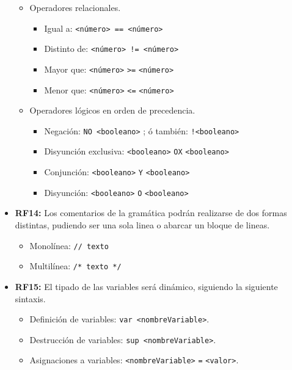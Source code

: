 \begin{itemize}
\begin{itemize}
        \item Operadores relacionales.
          
          \begin{itemize}
          \item Igual a:  \texttt{<número> == <número>}
          \item Distinto de: \texttt{<número> != <número>}
          \item Mayor que: \texttt{<número>} \texttt{>=} \texttt{<número>}
          \item Menor que: \texttt{<número>} \texttt{<=} \texttt{<número>}
          \end{itemize}
          
        \item Operadores lógicos en orden de precedencia.
          
          \begin{itemize}
          \item Negación: \texttt{NO <booleano>} ; ó también:  \texttt{!<booleano>}
          \item Disyunción exclusiva: \texttt{<booleano>} \texttt{OX} \texttt{<booleano>}
          \item Conjunción: \texttt{<booleano>} \texttt{Y} \texttt{<booleano>}
          \item Disyunción: \texttt{<booleano>} \texttt{O} \texttt{<booleano>}
          \end{itemize}
          
        \end{itemize}
        
      \item \textbf{RF14:} Los comentarios de la gramática podrán realizarse de dos formas distintas, pudiendo ser una sola linea o abarcar un bloque de lineas.
        
        \begin{itemize}
        \item Monolínea: \texttt{// texto}
        \item Multilínea: \texttt{/* texto */}
        \end{itemize}
        
      \item \textbf{RF15:} El tipado de las variables será dinámico, siguiendo la siguiente sintaxis.
        
        \begin{itemize}
        \item Definición de variables: \texttt{var <nombreVariable>}.
        \item Destrucción de variables: \texttt{sup <nombreVariable>}.
        \item Asignaciones a variables: \texttt{<nombreVariable>} \texttt{=} \texttt{<valor>}.
        \end{itemize}
        

\end{itemize}
